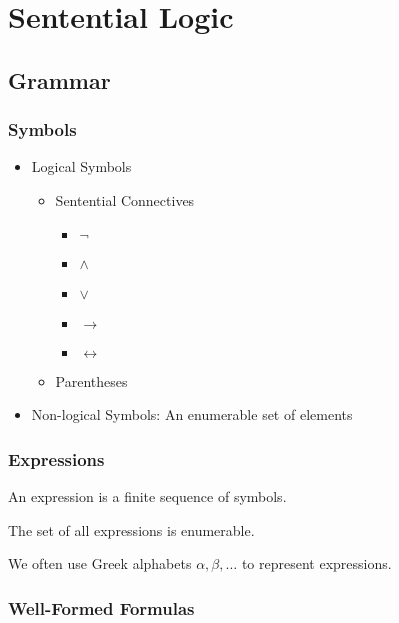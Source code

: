 \chapter{Sentential Logic}

\section{Grammar}
\label{sec:Gramma}

\subsection{Symbols}
\label{sub:Symbols}
\begin{itemize}
    \item Logical Symbols
    \begin{itemize}
        \item Sentential Connectives
        \begin{itemize}
            \item $\neg$
            \item $\wedge$
            \item $\vee$
            \item $\rightarrow$
            \item $\leftrightarrow$
        \end{itemize}
        \item Parentheses
    \end{itemize}
    \item Non-logical Symbols: An enumerable set of elements
\end{itemize}

\subsection{Expressions}
\label{sub:Expressions}

\begin{definition}[Expression]
    \label{def:Expression}
    An expression is a finite sequence of symbols.
\end{definition}
\begin{remark}
    The set of all expressions is enumerable.
\end{remark}

We often use Greek alphabets $\alpha,\beta,\dots$ to represent expressions.

\subsection{Well-Formed Formulas}
\label{sub:WellFormedFormulas}

